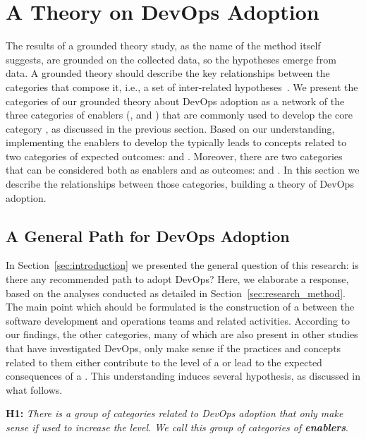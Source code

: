 \section{A Theory on DevOps Adoption} \label{sec:results}

The results of a grounded theory study, as the name of the method itself
suggests, are grounded on the collected data, so the hypotheses emerge from
data. A grounded theory should describe the key relationships between the
categories that compose it, i.e., a set of inter-related hypotheses~\cite{hoda2017becoming}.
We present the categories of our grounded theory
about DevOps adoption as a network of the three categories of enablers (,
 and ) that are commonly used to develop the core category
, as discussed in the previous section. Based on our understanding,
implementing the enablers to develop the  typically leads
to concepts related to two categories of expected outcomes:
 and . Moreover, there are two categories that can be considered
both as enablers and as outcomes:  and .
In this section we describe the relationships between those categories, building a theory
of DevOps adoption.

\subsection{A General Path for DevOps Adoption}

In Section~\ref{sec:introduction} we presented the general question of this
research: is there any recommended path to adopt DevOps? Here, we elaborate a response,
based on the analyses conducted as detailed in Section~\ref{sec:research_method}. The main
point which should be formulated is the construction of a  between the software development and operations teams and
related activities. According to our findings, the other categories,
many of which are also present in other studies that have investigated DevOps,
only make sense if the practices and
concepts related to them either contribute to the level of a  or lead to the expected consequences of a . This understanding induces several hypothesis, as discussed in
what follows.

\begin{mh}
\textbf{H1:} \textit{There is a group of categories related to DevOps adoption
that only make sense if used to increase the}  \emph{level. We
call this group of categories of \textbf{enablers}}.
\end{mh}

